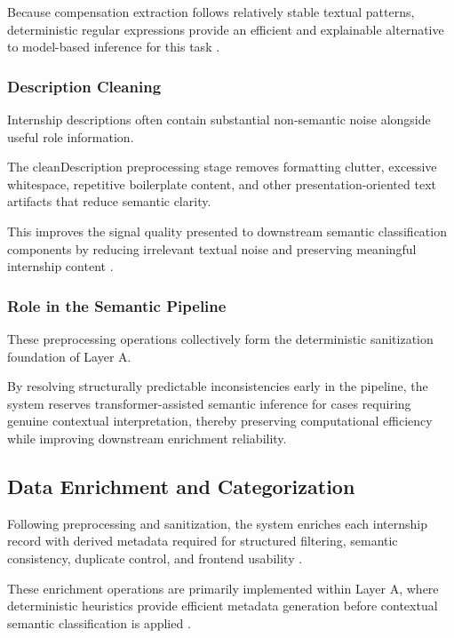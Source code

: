 Because compensation extraction follows relatively stable textual patterns, deterministic regular expressions provide an efficient and explainable alternative to model-based inference for this task \cite{sarawagi2008information}.

\subsubsection*{Description Cleaning}

Internship descriptions often contain substantial non-semantic noise alongside useful role information.

The cleanDescription preprocessing stage removes formatting clutter, excessive whitespace, repetitive boilerplate content, and other presentation-oriented text artifacts that reduce semantic clarity.

This improves the signal quality presented to downstream semantic classification components by reducing irrelevant textual noise and preserving meaningful internship content \cite{doan2012principles}.

\subsubsection*{Role in the Semantic Pipeline}

These preprocessing operations collectively form the deterministic sanitization foundation of Layer A.

By resolving structurally predictable inconsistencies early in the pipeline, the system reserves transformer-assisted semantic inference for cases requiring genuine contextual interpretation, thereby preserving computational efficiency while improving downstream enrichment reliability.

\subsection{Data Enrichment and Categorization}

Following preprocessing and sanitization, the system enriches each internship record with derived metadata required for structured filtering, semantic consistency, duplicate control, and frontend usability \cite{doan2012principles, sarawagi2008information}.

These enrichment operations are primarily implemented within Layer A, where deterministic heuristics provide efficient metadata generation before contextual semantic classification is applied \cite{schwartz2020green, reimers2019sentence}.

